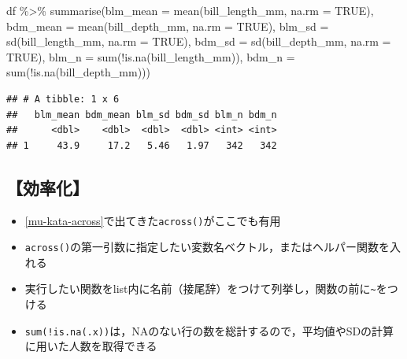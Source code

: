 \documentclass[
  xelatex,ja=standard, b5paper]{bxjsbook}
\newenvironment{Shaded}{\begin{snugshade}}{\end{snugshade}}
\newcommand{\AttributeTok}[1]{\textcolor[rgb]{0.77,0.63,0.00}{#1}}
\newcommand{\ConstantTok}[1]{\textcolor[rgb]{0.00,0.00,0.00}{#1}}
\newcommand{\FunctionTok}[1]{\textcolor[rgb]{0.00,0.00,0.00}{#1}}
\newcommand{\NormalTok}[1]{#1}
\newcommand{\SpecialCharTok}[1]{\textcolor[rgb]{0.00,0.00,0.00}{#1}}
\providecommand{\tightlist}{%
  \setlength{\itemsep}{0pt}\setlength{\parskip}{0pt}}
\begin{document}
\begin{Shaded}
\begin{Highlighting}[]
\NormalTok{df }\SpecialCharTok{\%\textgreater{}\%} 
  \FunctionTok{summarise}\NormalTok{(}\AttributeTok{blm\_mean =} \FunctionTok{mean}\NormalTok{(bill\_length\_mm, }\AttributeTok{na.rm =} \ConstantTok{TRUE}\NormalTok{),}
            \AttributeTok{bdm\_mean =} \FunctionTok{mean}\NormalTok{(bill\_depth\_mm, }\AttributeTok{na.rm =} \ConstantTok{TRUE}\NormalTok{),}
            \AttributeTok{blm\_sd =} \FunctionTok{sd}\NormalTok{(bill\_length\_mm, }\AttributeTok{na.rm =} \ConstantTok{TRUE}\NormalTok{),}
            \AttributeTok{bdm\_sd =} \FunctionTok{sd}\NormalTok{(bill\_depth\_mm, }\AttributeTok{na.rm =} \ConstantTok{TRUE}\NormalTok{),}
            \AttributeTok{blm\_n  =} \FunctionTok{sum}\NormalTok{(}\SpecialCharTok{!}\FunctionTok{is.na}\NormalTok{(bill\_length\_mm)),}
            \AttributeTok{bdm\_n  =} \FunctionTok{sum}\NormalTok{(}\SpecialCharTok{!}\FunctionTok{is.na}\NormalTok{(bill\_depth\_mm)))}
\end{Highlighting}
\end{Shaded}

\begin{verbatim}
## # A tibble: 1 x 6
##   blm_mean bdm_mean blm_sd bdm_sd blm_n bdm_n
##      <dbl>    <dbl>  <dbl>  <dbl> <int> <int>
## 1     43.9     17.2   5.46   1.97   342   342
\end{verbatim}

\hypertarget{su-st-ef}{%
\subsection{【効率化】}\label{su-st-ef}}

\begin{itemize}
\tightlist
\item
  \ref{mu-kata-across}で出てきた\texttt{across()}がここでも有用
\item
  \texttt{across()}の第一引数に指定したい変数名ベクトル，またはヘルパー関数を入れる
\item
  実行したい関数をlist内に名前（接尾辞）をつけて列挙し，関数の前に\texttt{\textasciitilde{}}をつける
\item
  \texttt{sum(!is.na(.x))}は，NAのない行の数を総計するので，平均値やSDの計算に用いた人数を取得できる
\end{itemize}
\end{document}
